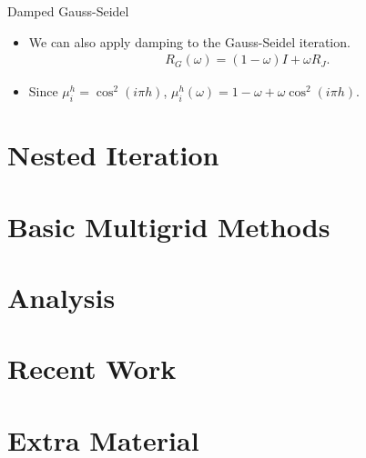 \documentclass{beamer}
\begin{document}
\begin{frame}[allowframebreaks]{Damped Gauss-Seidel}
 \begin{itemize}
  \item We can also apply damping to the Gauss-Seidel iteration.
  \begin{align}
   R_G(\omega) = (1-\omega)I + \omega R_J.
  \end{align}
  \item Since $\mu_i^h = \cos^2(i\pi h)$, $\mu_i^h(\omega) = 1 - \omega + \omega \cos^2(i\pi h)$.
 \end{itemize}
\end{frame}


\section{Nested Iteration}%

\section{Basic Multigrid Methods}%

\section{Analysis}%

\section{Recent Work}%

\section*{Extra Material}%
\end{document}
